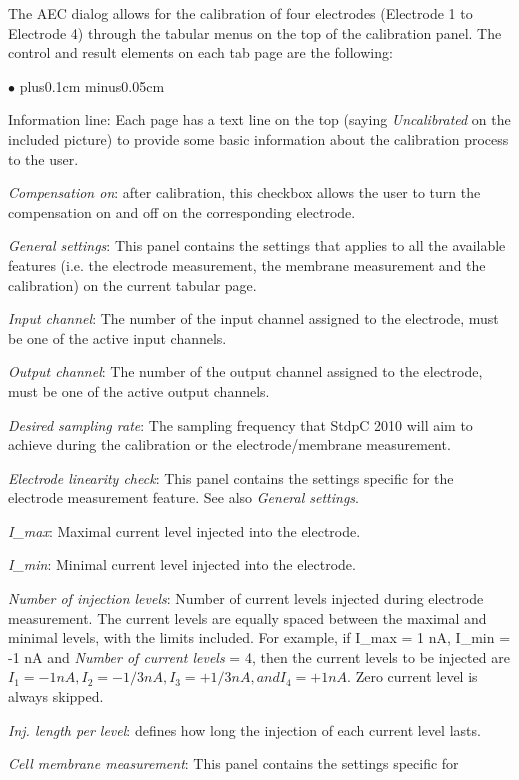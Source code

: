 \documentclass{article}
\newenvironment{myitem}{\begin{list}{$\bullet$}{\setlength{\leftmargin}{1.1em}
\itemsep0.1cm plus0.1cm minus0.05cm
\listparindent0cm
\addtolength{\labelsep}{0.5\labelsep}
\setlength{\labelwidth}{0.8em}
\setlength{\leftmargin}{\labelwidth}
\addtolength{\leftmargin}{\labelsep}
}}{\end{list}}
\begin{document}
The AEC dialog allows for the calibration of four electrodes (Electrode 1 to
Electrode 4) through the tabular menus on the top of the calibration
panel. The control and result elements on each tab page are the following:  
\begin{myitem}
\item Information line: Each page has a text line on the top (saying
  \emph{Uncalibrated} on the included picture) to provide some basic
  information about the calibration process to the user. 
\item \emph{Compensation on}: after calibration, this checkbox allows the
  user to turn the compensation on and off on the corresponding electrode.
\item \emph{General settings}: This panel contains the settings that
  applies to all the available features (i.e. the electrode measurement, the
  membrane measurement and the calibration) on the current tabular page.
\item \emph{Input channel}: The number of the input channel assigned to the
  electrode, must be one of the active input channels.
\item \emph{Output channel}: The number of the output channel assigned to the
  electrode, must be one of the active output channels.
\item \emph{Desired sampling rate}: The sampling frequency that StdpC 2010 will
  aim to achieve during the calibration or the electrode/membrane measurement.
\item \emph{Electrode linearity check}: This panel contains the settings specific for
  the electrode measurement feature. See also \emph{General settings}.
\item \emph{I\_max}: Maximal current level injected into the electrode.
\item \emph{I\_min}: Minimal current level injected into the electrode.
\item \emph{Number of injection levels}: Number of current levels
  injected during electrode measurement. The current levels are equally
  spaced between the maximal and minimal levels, with the limits
  included. For example, if I\_max = 1 nA, I\_min = -1 nA and \emph{Number of
  current levels} = 4, then the current levels to be injected are $I_1 =
  -1 nA, I_2 = -1/3 nA, I_3 = +1/3 nA, and I_4 = +1 nA$. Zero current level
  is always skipped.
\item \emph{Inj. length per level}: defines how long the injection of each
  current level lasts. 
\item \emph{Cell membrane measurement}: This panel contains the settings specific for

\end{myitem}
\end{document}
